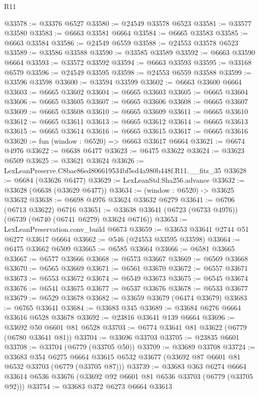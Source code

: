 \begin{lexlean}{R11}
\begin{coremodule}
@33578 := @33376 @6527
@33580 := @24549 @33578 @6523
@33581 := @33577 @33580
@33583 := @6663 @33581 @6664
@33584 := @6665 @33583
@33585 := @6663 @33584
@33586 := @24549 @6559
@33588 := @24553 @33578 @6523
@33589 := @33586 @33588
@33590 := @33585 @33589
@33592 := @6663 @33590 @6664
@33593 := @33572 @33592
@33594 := @6663 @33593
@33595 := @33168 @6579
@33596 := @24549 @33595
@33598 := @24553 @6559 @33588
@33599 := @33596 @33598
@33600 := @33594 @33599
@33602 := @6663 @33600 @6664
@33603 := @6665 @33602
@33604 := @6665 @33603
@33605 := @6665 @33604
@33606 := @6665 @33605
@33607 := @6665 @33606
@33608 := @6665 @33607
@33609 := @6665 @33608
@33610 := @6665 @33609
@33611 := @6665 @33610
@33612 := @6665 @33611
@33613 := @6665 @33612
@33614 := @6665 @33613
@33615 := @6665 @33614
@33616 := @6665 @33615
@33617 := @6665 @33616
@33620 := fun (window : @6520) => @6663 @33617 @6664
@33621 := @6674 @4976
@33622 := @6638 @6477
@33623 := @6475 @33622
@33624 := @33623 @6509
@33625 := @33621 @33624
@33626 := LexLeanPreserve.C8bae86ed806619534bf5ed4a980b448f.R11.__fits_35
@33628 := @6684 (@33626 @6477)
@33629 := LexLeanStd.Sha256.advance
@33632 := @33628 (@6638 (@33629 @6477))
@33634 := (window : @6520) -> @33625 @33632
@33638 := @6698 @4976 @33624 @33632 @6279
@33641 := @6706 (@6713 @33622) @6716
@33651 := @33638 @33641 (@6723 (@6733 @4976)) (@6739 (@6740 (@6741 @6279) @33624 @6716))
@33653 := LexLeanPreservation.conv_build @6673
@33659 := @33653 @33641 @2744 @51 @6277 @33617 @6664
@33662 := @546 (@24553 @33595 @33598)
@33664 := @6475 @33662 @6509
@33665 := @6585 @33664
@33666 := @6581 @33665
@33667 := @6577 @33666
@33668 := @6573 @33667
@33669 := @6569 @33668
@33670 := @6565 @33669
@33671 := @6561 @33670
@33672 := @6557 @33671
@33673 := @6553 @33672
@33674 := @6549 @33673
@33675 := @6545 @33674
@33676 := @6541 @33675
@33677 := @6537 @33676
@33678 := @6533 @33677
@33679 := @6529 @33678
@33682 := @33659 @33679 (@6474 @33679)
@33683 := @6765 @33641
@33684 := @33683 @345
@33689 := @33684 @6276 @6664 @33616 @6528 @33678
@33692 := @23816 @33641 @139 @6664
@33696 := @33692 @50 @6601 @81 @6528
@33703 := @6774 @33641 @81 @33622 (@6779 (@6780 @33641 @81))
@33704 := @33696 @33703
@33705 := @23835 @6601
@33708 := @33704 (@6779 (@33705 @50))
@33709 := @33689 @33708
@33724 := @33683
    @354
    @6275
    @6664
    @33615
    @6532
    @33677
    (@33692 @87 @6601 @81 @6532 @33703 (@6779 (@33705 @87)))
@33739 := @33683
    @363
    @6274
    @6664
    @33614
    @6536
    @33676
    (@33692 @92 @6601 @81 @6536 @33703 (@6779 (@33705 @92)))
@33754 := @33683
    @372
    @6273
    @6664
    @33613

\end{coremodule}
\end{lexlean}

